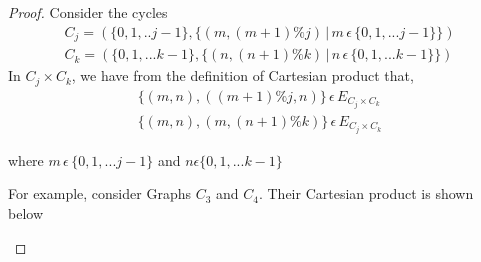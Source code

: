 \documentclass{article}
\begin{document}
\begin{proof}
Consider the cycles
\begin{align*}
C_j = (\{0, 1, .. j-1 \}, \{(m, {(m+1)\%j})\hspace{2pt} | \hspace{2pt} m \hspace{2pt} \epsilon \hspace{2pt} \{ 0, 1, ... j-1 \} \}) \\
C_k = (\{ 0, 1, ... k-1 \}, \{(n, {(n+1)\%k})\hspace{2pt} | \hspace{2pt} n \hspace{2pt} \epsilon \hspace{2pt} \{ 0, 1, ... k-1 \} \})
\end{align*}
In $C_j \times C_k$, we have from the definition of Cartesian product that,
\begin{align*}
\{(m,n), ((m+1)\%j, n)\} \hspace{2pt} \epsilon \hspace{2pt} E_{C_j \times C_k}\\
\{(m,n), (m, (n+1)\%k)\} \hspace{2pt} \epsilon \hspace{2pt} E_{C_j \times C_k}
\end{align*}
\begin{center}
where $m \hspace{2pt} \epsilon \hspace{2pt} \{ 0, 1, ... j-1 \}$ and  $n \epsilon \{ 0, 1, ... k-1 \}$
\end{center}
For example, consider Graphs $C_3$ and $C_4$. Their Cartesian product is shown below\\

\begin{center}

\end{center}
\begin{center}

\begin{tikzpicture}[every node/.style={draw,circle,minimum size=7mm}]


\end{tikzpicture}
\end{center}
\end{proof}
\end{document}
